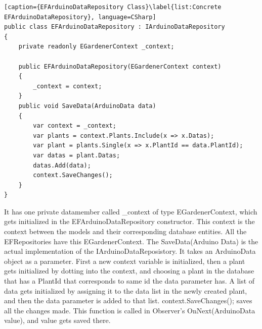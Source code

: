 \documentclass[a4paper,12pt,oneside,openright,titlepage]{book}
\begin{document}
\begin{lstlisting}[caption={EFArduinoDataRepository Class}\label{list:Concrete EFArduinoDataRepository}, language=CSharp]
public class EFArduinoDataRepository : IArduinoDataRepository
{
	private readonly EGardenerContext _context;
        
	public EFArduinoDataRepository(EGardenerContext context)
	{
        _context = context;
	}
	public void SaveData(ArduinoData data)
	{
		var context = _context;
		var plants = context.Plants.Include(x => x.Datas);
	    var plant = plants.Single(x => x.PlantId == data.PlantId);
        var datas = plant.Datas;
        datas.Add(data);
		context.SaveChanges();
	}
}
\end{lstlisting}

It has one private datamember called \_context of type EGardenerContext, which gets initialized in the EFArduinoDataRepository constructor. This context is the context between the models and their corresponding database entities. All the EFRepositories have this EGardenerContext. The SaveData(Arduino Data) is the actual implementation of the IArduinoDataReposistory. It takes an ArduinoData object as a parameter. First a new context variable is initialized, then a plant gets initialized by dotting into the context, and choosing a plant in the database that has a PlantId that corresponds to same id the data parameter has. A list of data gets initialized by assigning it to the data list in the newly created plant, and then the data parameter is added to that list. context.SaveChanges(); saves all the changes made.  This function is called in Observer's OnNext(ArduinoData value), and value gets saved there.
\end{document}
